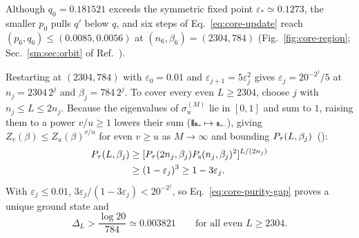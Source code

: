 Although $q_0=0.181521$ exceeds the symmetric fixed point
$\varepsilon_*\simeq0.1273$, the smaller $p_0$ pulls $q'$ below $q$,
and six steps of Eq.~\eqref{eq:core-update} reach
$(p_6,q_6)\le(0.0085,0.0056)$ at $(n_6,\beta_6)=(2304,784)$
(Fig.~\ref{fig:core-region}; Sec.~\ref{sm:sec:orbit} of Ref.~\cite{SM}).

Restarting at $(2304,784)$ with $\varepsilon_0=0.01$ and
$\varepsilon_{j+1}=5\varepsilon_j^2$ gives
$\varepsilon_j=20^{-2^j}/5$ at $n_j=2304\,2^j$ and
$\beta_j=784\,2^j$. To cover every even $L\ge2304$, choose $j$ with
$n_j\le L\le2n_j$. Because the eigenvalues of $\sigma_u^{(M)}$ lie in
$[0,1]$ and sum to $1$, raising them to a power $v/u\ge1$ lowers their
sum
($\specbars[black!55]{.6,.3,.1}\mapsto\specbars[black!55]{.36,.09,.01}$),
giving $Z_v(\beta)\le Z_u(\beta)^{v/u}$ for even $v\ge u$ as
$M\to\infty$ and bounding $P_{\tau}(L,\beta_j)$~(\interpolationglyph):%
~
\begin{align}
    P_{\tau}(L,\beta_j)
     &\ge[P_{\tau}(2n_j,\beta_j)P_{\mathrm s}(n_j,\beta_j)^2]^{L/(2n_j)}
    \nonumber\\
     &\ge(1-\varepsilon_j)^3\ge1-3\varepsilon_j.
    \label{eq:core-interpolation}
\end{align}
With $\varepsilon_j\le0.01$, $3\varepsilon_j/(1-3\varepsilon_j)<20^{-2^j}$,
so Eq.~\eqref{eq:core-purity-gap} proves a unique ground state and%
~
\begin{equation*}
    \Delta_L>\frac{\log20}{784}\simeq0.003821
    \qquad\text{for all even }L\ge2304.
\end{equation*}

